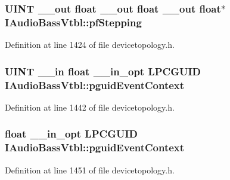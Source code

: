 \subsubsection[{\texorpdfstring{pf\+Stepping}{pfStepping}}]{ {\bf U\+I\+NT} {\bf \+\_\+\+\_\+out} float {\bf \+\_\+\+\_\+out} float {\bf \+\_\+\+\_\+out} float$\ast$ I\+Audio\+Bass\+Vtbl\+::pf\+Stepping}\hypertarget{struct_i_audio_bass_vtbl_a122f03f151e2a9d903aa8bb1837a4047}{}\label{struct_i_audio_bass_vtbl_a122f03f151e2a9d903aa8bb1837a4047}


Definition at line 1424 of file devicetopology.\+h.

\subsubsection[{\texorpdfstring{pguid\+Event\+Context}{pguidEventContext}}]{ {\bf U\+I\+NT} {\bf \+\_\+\+\_\+in} float {\bf \+\_\+\+\_\+in\+\_\+opt} {\bf L\+P\+C\+G\+U\+ID} I\+Audio\+Bass\+Vtbl\+::pguid\+Event\+Context}\hypertarget{struct_i_audio_bass_vtbl_a69821c6fd59f2a0443d2aa39f37b869b}{}\label{struct_i_audio_bass_vtbl_a69821c6fd59f2a0443d2aa39f37b869b}


Definition at line 1442 of file devicetopology.\+h.

\subsubsection[{\texorpdfstring{pguid\+Event\+Context}{pguidEventContext}}]{ float {\bf \+\_\+\+\_\+in\+\_\+opt} {\bf L\+P\+C\+G\+U\+ID} I\+Audio\+Bass\+Vtbl\+::pguid\+Event\+Context}\hypertarget{struct_i_audio_bass_vtbl_a161742755021eec6f64c05431d2bc2ba}{}\label{struct_i_audio_bass_vtbl_a161742755021eec6f64c05431d2bc2ba}


Definition at line 1451 of file devicetopology.\+h.

